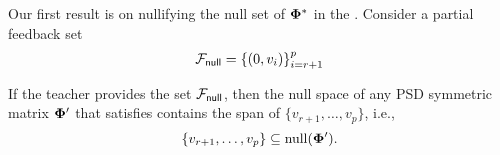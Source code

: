 Our first result is on nullifying the null set of $\boldsymbol{\Phi}^*$ in the . Consider a partial feedback set 
\begin{align*}
    {\mathcal{F}}_{\textsf{null}} = \left\{(0, v_{i})\right\}_{i = r+1}^p
\end{align*}
\begin{lemma}\label{lem: nullset}
    If the teacher provides the set ${\mathcal{F}}_{\textsf{null}}$, then the null space of any PSD symmetric matrix $\boldsymbol{\Phi}'$ that satisfies  contains the span of $\{v_{r+1}, \ldots, v_p\}$, i.e.,
    \begin{equation*}
        \{v_{r+1}, \ldots, v_p\} \subseteq \mathrm{null}({\boldsymbol{\Phi}'}).
    \end{equation*}
\end{lemma}
